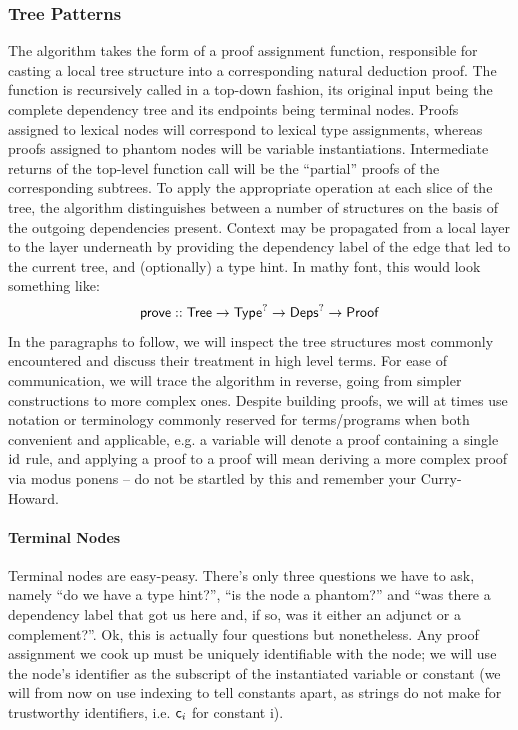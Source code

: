 \subsubsection{Tree Patterns}
The algorithm takes the form of a proof assignment function, responsible for casting a local tree structure into a corresponding natural deduction proof.
The function is recursively called in a top-down fashion, its original input being the complete dependency tree and its endpoints being terminal nodes.
Proofs assigned to lexical nodes will correspond to lexical type assignments, whereas proofs assigned to phantom nodes will be variable instantiations.
Intermediate returns of the top-level function call will be the ``partial'' proofs of the corresponding subtrees.
To apply the appropriate operation at each slice of the tree, the algorithm distinguishes between a number of structures on the basis of the outgoing dependencies present.
Context may be propagated from a local layer to the layer underneath by providing the dependency label of the edge that led to the current tree, and (optionally) a type hint.
In mathy font, this would look something like:
\begin{align*}
\mathsf{prove} :: \mathsf{Tree} \to \mathsf{Type}^? \to {\ensuremath{\mathsf{Deps}}}^? \to \mathsf{Proof}
\end{align*}
In the paragraphs to follow, we will inspect the tree structures most commonly encountered and discuss their treatment in high level terms.
For ease of communication, we will trace the algorithm in reverse, going from simpler constructions to more complex ones.
Despite building proofs, we will at times use notation or terminology commonly reserved for terms/programs when both convenient and applicable, e.g. a variable will denote a proof containing a single $\mathrm{id}$ rule, and applying a proof to a proof will mean deriving a more complex proof via modus ponens -- do not be startled by this and remember your Curry-Howard.

\paragraph{Terminal Nodes}
Terminal nodes are easy-peasy.
There's only three questions we have to ask, namely ``do we have a type hint?'', ``is the node a phantom?'' and ``was there a dependency label that got us here and, if so, was it either an adjunct or a complement?''.
Ok, this is actually four questions but nonetheless.
Any proof assignment we cook up must be uniquely identifiable with the node; we will use the node's identifier as the subscript of the instantiated variable or constant (we will from now on use indexing to tell constants apart, as strings do not make for trustworthy identifiers, i.e. $\mathsf{c}_{\mathnormal{i}}$ for constant i).

